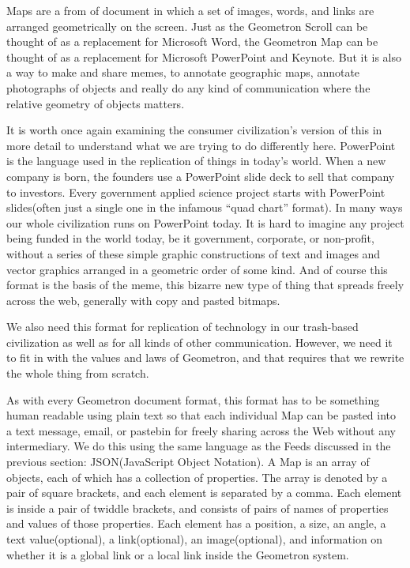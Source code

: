 
Maps are a from of document in which a set of images, words, and links are arranged geometrically on the screen.  Just as the Geometron Scroll can be thought of as a replacement for Microsoft Word, the Geometron Map can be thought of as a replacement for Microsoft PowerPoint and Keynote.  But it is also a way to make and share memes, to annotate geographic maps, annotate photographs of objects and really do any kind of communication where the relative geometry of objects matters.

It is worth once again examining the consumer civilization's version of this in more detail to understand what we are trying to do differently here.  PowerPoint is the language used in the replication of things in today's world.  When a new company is born, the founders use a PowerPoint slide deck to sell that company to investors.  Every government applied science project starts with PowerPoint slides(often just a single one in the infamous ``quad chart'' format).  In many ways our whole civilization runs on PowerPoint today.  It is hard to imagine any project being funded in the world today, be it government, corporate, or non-profit, without a series of these simple graphic constructions of text and images and vector graphics arranged in a geometric order of some kind.  And of course this format is the basis of the meme, this bizarre new type of thing that spreads freely across the web, generally with copy and pasted bitmaps.  

We also need this format for replication of technology in our trash-based civilization as well as for all kinds of other communication.  However, we need it to fit in with the values and laws of Geometron, and that requires that we rewrite the whole thing from scratch. 

As with every Geometron document format, this format has to be something human readable using plain text so that each individual Map can be pasted into a text message, email, or pastebin for freely sharing across the Web without any intermediary.  We do this using the same language as the Feeds discussed in the previous section: JSON(JavaScript Object Notation).  A Map is an array of objects, each of which has a collection of properties.  The array is denoted by a pair of square brackets, and each element is separated by a comma.  Each element is inside a pair of twiddle brackets, and consists of pairs of names of properties and values of those properties.  Each element has a position, a size, an angle, a text value(optional), a link(optional), an image(optional), and information on whether it is a global link or a local link inside the Geometron system.  

